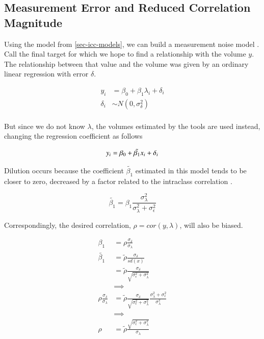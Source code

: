 \documentclass[
  authoryear,
  preprint,
  1p]{elsarticle}
\begin{document}
\FloatBarrier

\subsection{Measurement Error and Reduced Correlation
Magnitude}\label{sec-measurement-error}

Using the model from \ref{sec-icc-models}, we can build a measurement
noise model \citep[e.g.,][]{frost_correcting_2000}. Call the final
target for which we hope to find a relationship with the volume \(y\).
The relationship between that value and the volume was given by an
ordinary linear regression with error \(\delta\).

\[
\begin{aligned}
y_i & = \beta_0 + \beta_1\lambda_i + \delta_i \\
\delta_i & \sim N(0, \sigma_\delta^2) \\
\end{aligned}
\]

But since we do not know \(\lambda\), the volumes estimated by the tools
are used instead, changing the regression coefficient as follows

\[
y_i = \beta_0 + \tilde{\beta_1}x_i + \delta_i \\
\]

Dilution occurs because the coefficient \(\tilde{\beta_1}\) estimated in
this model tends to be closer to zero, decreased by a factor related to
the intraclass correlation \citep{frost_correcting_2000}.

\[
\tilde{\beta_1} = \beta_1\frac{\sigma_\lambda^2}{\sigma_\lambda^2 + \sigma_\epsilon^2}
\]

Correspondingly, the desired correlation, \(\rho=cor(y,\lambda)\), will
also be biased.

\[
\begin{aligned}
\beta_1 & = \rho\frac{\sigma_\delta}{\sigma_\lambda} \\
\tilde{\beta_1} & = \tilde{\rho}\frac{\sigma_\delta}{sd(x)} \\ 
& =  \tilde{\rho} \frac{\sigma_\delta}{\sqrt{\sigma_\epsilon^2 + \sigma_\lambda^2}} \\
&  \implies \\
\rho \frac{\sigma_\delta}{\sigma_\lambda} &  = \tilde{\rho}\frac{\sigma_\delta}{\sqrt{\sigma_\epsilon^2+\sigma_\lambda^2}} \frac{\sigma_\lambda^2 + \sigma_\epsilon^2}{\sigma_\lambda^2} \\
&  \implies \\
\rho & = \tilde{\rho} \frac{\sqrt{\sigma_\epsilon^2+\sigma_\lambda^2}}{\sigma_\lambda }
\end{aligned}
\]
\end{document}
